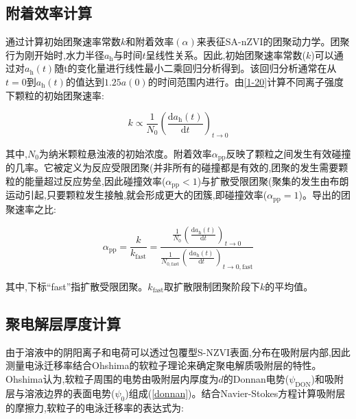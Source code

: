 \subsection{附着效率计算}

通过计算初始团聚速率常数$k$和附着效率$(\alpha)$来表征SA-nZVI的团聚动力学。团聚行为刚开始时,水力半径$a_\mathrm{h}$与时间$t$呈线性关系。因此,初始团聚速率常数($k$)可以通过对$a_\mathrm{h}(t)$随t的变化量进行线性最小二乘回归分析得到。该回归分析通常在从$t = 0$到$a_\mathrm{h}(t)$的值达到$1.25a(0)$的时间范围内进行\cite{ChenElimelech-762}。由\cref{1-20}计算不同离子强度下颗粒的初始团聚速率\cite{ChenMylon-760}:

\begin{equation}\label{1-20}
    k\propto\frac{1}{N_0}\left(\frac{\mathrm{d}a_\mathrm{h}(t)}{\mathrm{d}t}\right)_{t\rightarrow0}
\end{equation}

其中,$N_0$为纳米颗粒悬浊液的初始浓度。附着效率$\alpha_{\mathrm {pp}}$反映了颗粒之间发生有效碰撞的几率。它被定义为反应受限团聚(并非所有的碰撞都是有效的,团聚的发生需要颗粒的能量超过反应势垒,因此碰撞效率($\alpha_\mathrm{pp}<1$)与扩散受限团聚(聚集的发生由布朗运动引起,只要颗粒发生接触,就会形成更大的团簇,即碰撞效率($\alpha_\mathrm{pp}=1$)。导出的团聚速率之比\cite{doi:10.1021/la062072v}:

\begin{equation}\label{alpha_ppexp}
  \alpha_{\mathrm{pp}}=\frac{k}{k_{\mathrm{fast}}}=\frac{\frac{1}{N_0}\left(\frac{\mathrm{d}a_\mathrm{h}(t)}{\mathrm{d}t}\right)_{t\rightarrow0}}{\frac{1}{N_{0,\mathrm{fast}}}\left(\frac{\mathrm{d}a_\mathrm{h}(t)}{\mathrm{d}t}\right)_{t\rightarrow0,\mathrm{fast}}}
\end{equation}

其中,下标“fast”指扩散受限团聚。$k_{\mathrm{fast}}$取扩散限制团聚阶段下$k$的平均值。

\subsection{聚电解层厚度计算}

由于溶液中的阴阳离子和电荷可以透过包覆型S-NZVI表面,分布在吸附层内部,因此测量电泳迁移率结合Ohshima的软粒子理论来确定聚电解质吸附层的特性。Ohshima认为,软粒子周围的电势由吸附层内厚度为$d$的Donnan电势($\psi_\mathrm{DON}$)和吸附层与溶液边界的表面电势($\psi_\mathrm{0}$)组成\cite{2006315,OHSHIMA20152,Ohshima1995}(\cref{donnan})。结合Navier-Stokes方程计算吸附层的摩擦力,软粒子的电泳迁移率的表达式为\cite{Oshima1992}:

